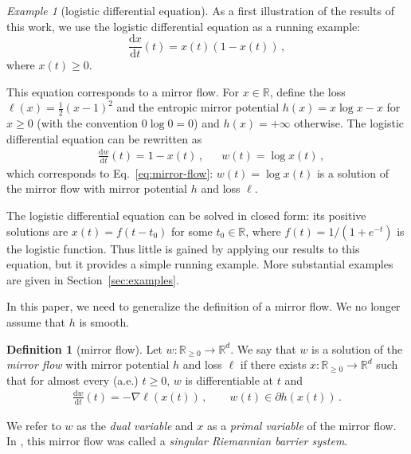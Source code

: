 \documentclass[11pt,english,reqno]{article}
\newcommand{\diff}{\mathrm{d}}
\newcommand{\R}{\mathbb{R}}
\renewcommand{\geq}{\geqslant}
\theoremstyle{plain}
\theoremstyle{definition}
\newtheorem{definition}[proposition]{Definition}
\theoremstyle{remark}
\newtheorem{example}[proposition]{Example}
\numberwithin{equation}{section}
\begin{document}
\begin{example}[logistic differential equation]
	\label{ex:logistic-1}
	As a first illustration of the results of this work, we use the logistic differential equation as a running example: 
	\begin{equation*}
		\frac{\diff x}{\diff t}(t) = x(t) (1-x(t)) \, , 
	\end{equation*}
	where $x(t) \geq 0$. 
	
		This equation corresponds to a mirror flow. For $x \in \R$, define the loss $\ell(x) = \frac{1}{2} (x-1)^2$ and the entropic mirror potential $h(x) = x \log x - x$ for $x \geq 0$ (with the convention $0 \log 0 = 0$) and $h(x) = +\infty$ otherwise. The logistic differential equation can be rewritten as 
\begin{align*}
	&\frac{\diff w}{\diff t}(t) = 1 - x(t) \, , &&w(t) = \log x(t) \, ,
\end{align*}
which corresponds to Eq.~\eqref{eq:mirror-flow}: $w(t) = \log x(t)$ is a solution of the mirror flow with mirror potential $h$ and loss $\ell$.

		
		The logistic differential equation can be solved in closed form: its positive solutions are $x(t) = f(t-t_0)$ for some $t_0 \in \R$, where $f(t) = 1/(1+e^{-t})$ is the logistic function. Thus little is gained by applying our results to this equation, but it provides a simple running example. More substantial examples are given in Section~\ref{sec:examples}.
\end{example}

In this paper, we need to generalize the definition of a mirror flow. We no longer assume that $h$ is smooth.

\begin{definition}[mirror flow]
	\label{def:mirror-flow}
	Let $w : \R_{\geq 0} \to \R^d$. We say that $w$ is a solution of the \emph{mirror flow} with mirror potential $h$ and loss $\ell$ if there exists $x : \R_{\geq 0} \to \R^d$ such that for almost every (a.e.) $t \geq 0$, $w$ is differentiable at $t$ and
\begin{align*}
	\frac{\diff w}{\diff t}(t) = - \nabla \ell(x(t)) \, , \qquad w(t) \in \partial h(x(t)) \, .
\end{align*}
\end{definition}
We refer to $w$ as the \emph{dual variable} and $x$ as a \emph{primal variable} of the mirror flow. In \cite{attouch2004singular}, this mirror flow was called a \emph{singular Riemannian barrier system}.
\end{document}
